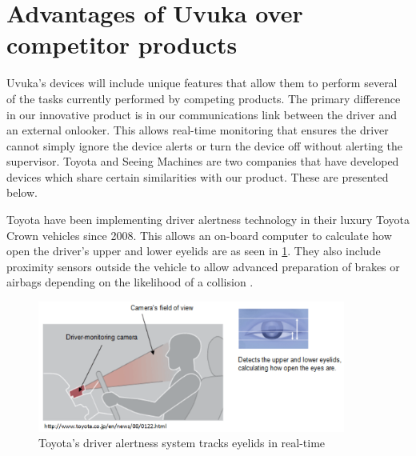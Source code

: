 \section{Advantages of Uvuka over competitor products}
\label{sec:advantages}
Uvuka's devices will include unique features that allow them to perform several of the tasks currently performed by competing products. The primary difference in our innovative product is in our communications link between the driver and an external onlooker. This allows real-time monitoring that ensures the driver cannot simply ignore the device alerts or turn the device off without alerting the supervisor. Toyota and Seeing Machines are two companies that have developed devices which share certain similarities with our product. These are presented below.

\newpage
Toyota have been implementing driver alertness technology in their luxury Toyota Crown vehicles since 2008. This allows an on-board computer to calculate how open the driver's upper and lower eyelids are as seen in \cref{fig:toyota_sensors}. They also include proximity sensors outside the vehicle to allow advanced preparation of brakes or airbags depending on the likelihood of a collision \cite{toyota}. 
\begin{figure}[H]
\centering
\includegraphics[width=0.9\textwidth]{images/toyota.PNG}
\vskip10pt
\caption[Toyota driver alertness system]{Toyota's driver alertness system tracks eyelids in real-time \cite{toyota}}
\label{fig:toyota_sensors}
\end{figure}

